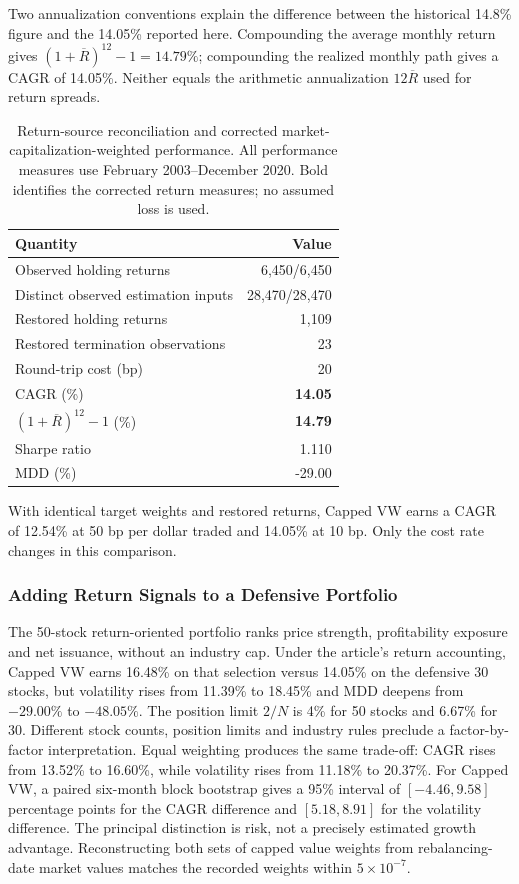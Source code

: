 \documentclass[letterpaper,journal]{IEEEtran}
\begin{document}
Two annualization conventions explain the difference between the historical 14.8\% figure and the 14.05\% reported here. Compounding the average monthly return gives $(1+\overline R)^{12}-1=14.79\%$; compounding the realized monthly path gives a CAGR of 14.05\%. Neither equals the arithmetic annualization $12\overline R$ used for return spreads.

\begin{table}[!htbp]\centering
\caption{Return-source reconciliation and corrected market-capitalization-weighted performance. All performance measures use February 2003--December 2020. Bold identifies the corrected return measures; no assumed loss is used.}\label{tab:returnrecovery}
\small\begin{tabular}{lr}\toprule
Quantity & Value\\\midrule
Observed holding returns & 6,450/6,450\\
Distinct observed estimation inputs & 28,470/28,470\\
Restored holding returns & 1,109\\
Restored termination observations & 23\\
Round-trip cost (bp) & 20\\
CAGR (\%) & \textbf{14.05}\\
$(1+\overline R)^{12}-1$ (\%) & \textbf{14.79}\\
Sharpe ratio & 1.110\\
MDD (\%) & -29.00\\
\bottomrule\end{tabular}\end{table}

With identical target weights and restored returns, Capped VW earns a CAGR of 12.54\% at 50 bp per dollar traded and 14.05\% at 10 bp. Only the cost rate changes in this comparison.

\subsubsection{Adding Return Signals to a Defensive Portfolio}\label{sec:selectionrisk}
The 50-stock return-oriented portfolio ranks price strength, profitability exposure and net issuance, without an industry cap. Under the article's return accounting, Capped VW earns 16.48\% on that selection versus 14.05\% on the defensive 30 stocks, but volatility rises from 11.39\% to 18.45\% and MDD deepens from $-29.00\%$ to $-48.05\%$. The position limit $2/N$ is 4\% for 50 stocks and 6.67\% for 30. Different stock counts, position limits and industry rules preclude a factor-by-factor interpretation. Equal weighting produces the same trade-off: CAGR rises from 13.52\% to 16.60\%, while volatility rises from 11.18\% to 20.37\%. For Capped VW, a paired six-month block bootstrap gives a 95\% interval of $[-4.46,9.58]$ percentage points for the CAGR difference and $[5.18,8.91]$ for the volatility difference. The principal distinction is risk, not a precisely estimated growth advantage. Reconstructing both sets of capped value weights from rebalancing-date market values matches the recorded weights within $5\times10^{-7}$.
\end{document}
